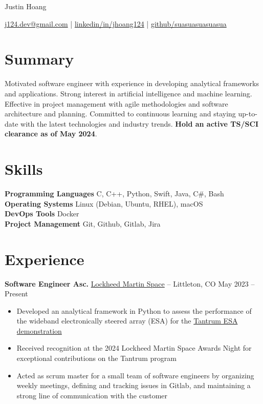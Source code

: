 \documentclass[11pt]{article}       %
\begin{document}
\centerline{\Huge Justin Hoang}

\vspace{5pt}

\centerline{\href{mailto:j124.dev@gmail.com}{j124.dev@gmail.com}
  | \href{https://www.linkedin.com/in/jhoang124/}{linkedin/in/jhoang124}
  | \href{https://github.com/suasuasuasuasua}{github/suasuasuasuasua}}

\vspace{-10pt}

\section*{Summary}
Motivated software engineer with experience in developing analytical frameworks
and applications. Strong interest in artificial intelligence and machine
learning. Effective in project management with agile methodologies and software
architecture and planning. Committed to continuous learning and staying
up-to-date with the latest technologies and industry trends. \textbf{Hold an
  active TS/SCI clearance as of May 2024}.

\vspace{-6.5pt}

\section*{Skills}
\textbf{Programming Languages} C, C++, Python, Swift, Java, C\#, Bash \\
\textbf{Operating Systems} Linux (Debian, Ubuntu, RHEL), macOS \\
\textbf{DevOps Tools} Docker \\
\textbf{Project Management} Git, Github, Gitlab, Jira \\

\vspace{-6.5pt}

\section*{Experience}
\textbf{Software Engineer Asc.} \href{https://www.lockheedmartin.com/en-us/capabilities/space.html}{Lockheed Martin Space}
-- Littleton, CO \hfill May 2023 -- Present \\
\vspace{-9pt}
\begin{itemize}
  \item Developed an analytical framework in Python to assess the performance of
        the wideband electronically steered array (ESA) for the
        \href{https://news.lockheedmartin.com/ESA_payload_demonstrator}{Tantrum ESA demonstration}
  \item Received recognition at the 2024 Lockheed Martin Space Awards Night for
        exceptional contributions on the Tantrum program
  \item Acted as scrum master for a small team of software engineers by
        organizing weekly meetings, defining and tracking issues in Gitlab, and
        maintaining a strong line of communication with the customer
\end{itemize}
\end{document}
